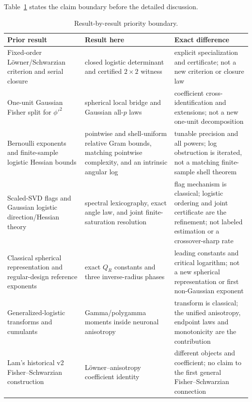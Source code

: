 \documentclass[11pt]{article}
\begin{document}
Table~\ref{tab:priority} states the claim boundary before the detailed discussion.
\begin{table}[H]
\centering
\small
\begin{tabular}{>{\raggedright\arraybackslash}p{}
                >{\raggedright\arraybackslash}p{}
                >{\raggedright\arraybackslash}p{}}
\toprule
Prior result & Result here & Exact difference \\
\midrule
Fixed-order L\"owner/Schwarzian criterion and serial closure
\cite{kozlovski2008,cook2023}
& closed logistic determinant and certified $2\times2$ witness
& explicit specialization and certificate; not a new criterion or closure law \\[3pt]
One-unit Gaussian Fisher split for $\phi'^2$ \cite{amari2019}
& spherical local bridge and Gaussian all-$p$ laws
& coefficient cross-identification and extensions; not a new one-unit decomposition \\[3pt]
Bernoulli exponents and finite-sample logistic Hessian bounds
\cite{chen2026gd,ostrovskii2021,chardon2024,fisher2023}
 & pointwise and shell-uniform relative Gram bounds, matching pointwise complexity, and an intrinsic angular log
 & tunable precision and all powers; log obstruction is iterated, not a matching finite-sample shell theorem \\[3pt]
 Scaled-SVD flags \cite{stewart1984} and Gaussian logistic direction/Hessian theory
 \cite{hsu2024,chardon2024,chen2026gd,chen2026minimax}
 & spectral lexicography, exact angle law, and joint finite-saturation resolution
 & flag mechanism is classical; logistic ordering and joint certificate are the refinement; not labeled estimation
 or a crossover-sharp rate \\[3pt]
 Classical spherical representation \cite{cambanis1981} and regular-design reference exponents \cite{chardon2024}
 & exact $Q_R$ constants and three inverse-radius phases
 & leading constants and critical logarithm; not a new spherical representation or first
non-Gaussian exponent \\[3pt]
Generalized-logistic transforms and cumulants \cite{ojo2004,lee2025}
& Gamma/polygamma moments inside neuronal anisotropy
& transform is classical; the unified anisotropy, endpoint laws and monotonicity are the contribution \\[3pt]
Lam's historical v2 Fisher--Schwarzian construction \cite{lam2026v2}
& L\"owner--anisotropy coefficient identity
& different objects and coefficient; no claim to the first general Fisher--Schwarzian connection \\
\bottomrule
\end{tabular}
\caption{Result-by-result priority boundary.}
\label{tab:priority}
\end{table}
\end{document}
